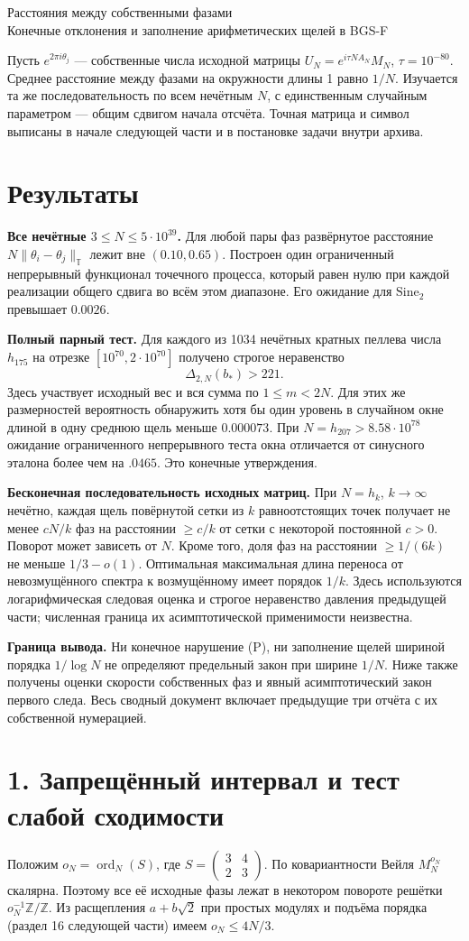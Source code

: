 \documentclass[11pt,a4paper]{article}
\newcommand{\Z}{\mathbb Z}
\newcommand{\si}{\mathrm{Sine}_2}
\newcommand{\sect}[1]{\section*{\sffamily\color{ink}#1}}
\newcommand{\T}{\mathbb T}
\begin{document}
\begin{center}{\LARGE\sffamily Расстояния между собственными фазами}\\[4pt]
{\large Конечные отклонения и заполнение арифметических щелей в BGS-F}
\end{center}
Пусть $e^{2\pi i\theta_j}$ --- собственные числа исходной матрицы $U_N=e^{i\tau NA_N}M_N$, $\tau=10^{-80}$. Среднее расстояние между фазами на окружности длины 1 равно $1/N$. Изучается та же последовательность по всем нечётным $N$, с единственным случайным параметром --- общим сдвигом начала отсчёта. Точная матрица и символ выписаны в начале следующей части и в постановке задачи внутри архива.

\sect{Результаты}
\textbf{Все нечётные $3\le N\le5\cdot10^{39}$.} Для любой пары фаз развёрнутое расстояние $N\|\theta_i-\theta_j\|_{\T}$ лежит вне $(0.10,0.65)$. Построен один ограниченный непрерывный функционал точечного процесса, который равен нулю при каждой реализации общего сдвига во всём этом диапазоне. Его ожидание для $\si$ превышает $0.0026$.

\textbf{Полный парный тест.} Для каждого из 1034 нечётных кратных пеллева числа $h_{175}$ на отрезке $[10^{70},2\cdot10^{70}]$ получено строгое неравенство
\[
                        \boxed{\Delta_{2,N}(b_*)>221.}
\]
Здесь участвует исходный вес и вся сумма по $1\le m<2N$. Для этих же размерностей вероятность обнаружить хотя бы один уровень в случайном окне длиной в одну среднюю щель меньше $0.000073$. При $N=h_{207}>8.58\cdot10^{78}$ ожидание ограниченного непрерывного теста окна отличается от синусного эталона более чем на $.0465$. Это конечные утверждения.

\textbf{Бесконечная последовательность исходных матриц.} При $N=h_k$, $k\to\infty$ нечётно, каждая щель повёрнутой сетки из $k$ равноотстоящих точек получает не менее $cN/k$ фаз на расстоянии $\ge c/k$ от сетки с некоторой постоянной $c>0$. Поворот может зависеть от $N$. Кроме того, доля фаз на расстоянии $\ge1/(6k)$ не меньше $1/3-o(1)$. Оптимальная максимальная длина переноса от невозмущённого спектра к возмущённому имеет порядок $1/k$. Здесь используются логарифмическая следовая оценка и строгое неравенство давления предыдущей части; численная граница их асимптотической применимости неизвестна.

\textbf{Граница вывода.} Ни конечное нарушение (P), ни заполнение щелей шириной порядка $1/\log N$ не определяют предельный закон при ширине $1/N$. Ниже также получены оценки скорости собственных фаз и явный асимптотический закон первого следа. Весь сводный документ включает предыдущие три отчёта с их собственной нумерацией.
\newpage
\sect{1. Запрещённый интервал и тест слабой сходимости}
Положим $o_N=\operatorname{ord}_N(S)$, где $S=\left(\begin{smallmatrix}3&4\\2&3\end{smallmatrix}\right)$. По ковариантности Вейля $M_N^{o_N}$ скалярна. Поэтому все её исходные фазы лежат в некотором повороте решётки $o_N^{-1}\Z/\Z$. Из расщепления $a+b\sqrt2$ при простых модулях и подъёма порядка (раздел 16 следующей части) имеем $o_N\le4N/3$.
\end{document}
